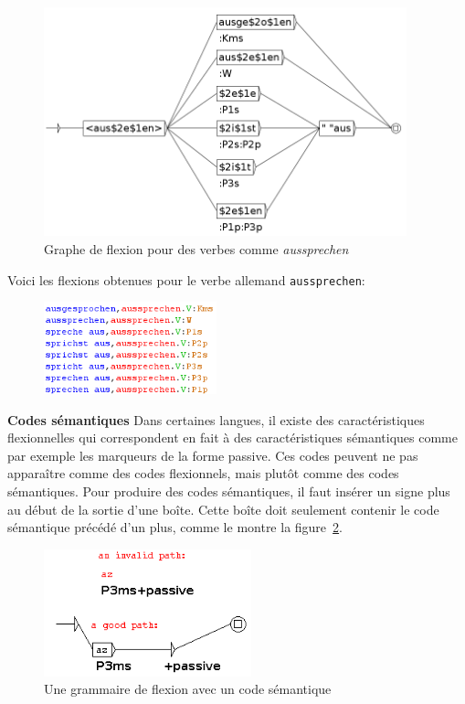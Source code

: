 \bigskip
\begin{figure}[!ht]
\begin{center}
\includegraphics[width=10.5cm]{resources/img/fig3-Advanced_operators_with_Variables-V_aussprechen.png}
\caption{Graphe de flexion pour des verbes comme {\it aussprechen}
\label{fig-inflection-aussprechen}}
\end{center}
\end{figure}

\noindent Voici les flexions obtenues pour le verbe allemand \verb+aussprechen+:
\bigskip
\begin{figure}[!ht]
\begin{center}
\includegraphics[width=5cm]{resources/img/fig3-flexion_aussprechen2.png}
\end{center}
\end{figure}

\bigskip
\noindent \textbf{Codes sémantiques}
\noindent Dans certaines langues, il existe des caractéristiques flexionnelles qui correspondent
en fait à des caractéristiques sémantiques comme par exemple les marqueurs de la forme passive.
Ces codes peuvent ne pas apparaître comme des codes flexionnels, mais plutôt comme des codes
sémantiques. Pour produire des codes sémantiques, il faut insérer un signe plus au début de la
sortie d'une boîte. Cette boîte doit seulement contenir le code sémantique précédé d'un plus, comme
le montre la figure~\ref{fig-inflection-sem}.

\bigskip
\begin{figure}[!ht]
\begin{center}
\includegraphics[width=6cm]{resources/img/fig3-9sem.png}
\caption{Une grammaire de flexion avec un code sémantique\label{fig-inflection-sem}}
\end{center}
\end{figure}

